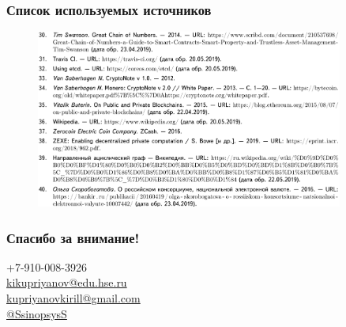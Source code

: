 \documentclass{beamer}
\begin{document}
\begin{frame}
    \frametitle{Список используемых источников}
    \begin{figure}
        \centering
        \includegraphics[width=0.9\textwidth]{lib3}
    \end{figure}
\end{frame}

\begin{frame}[c]
\begin{center}
\frametitle{\LARGE Спасибо за внимание!}

{\LARGE \inserttitle}

\bigskip

{\insertauthor}

\bigskip\bigskip

{\scriptsize \color{HSEblue}
    +7-910-008-3926\\
    \href{mailto:kikupriyanov@edu.hse.ru}{kikupriyanov@edu.hse.ru}\\
    \href{mailto:kupriyanovkirill@gmail.com}{kupriyanovkirill@gmail.com}\\
    \href{https://t.me/SsinopsysS}{@SsinopsysS}}

\bigskip\bigskip

{\large \insertdate}
\end{center}
\end{frame}
\end{document}
